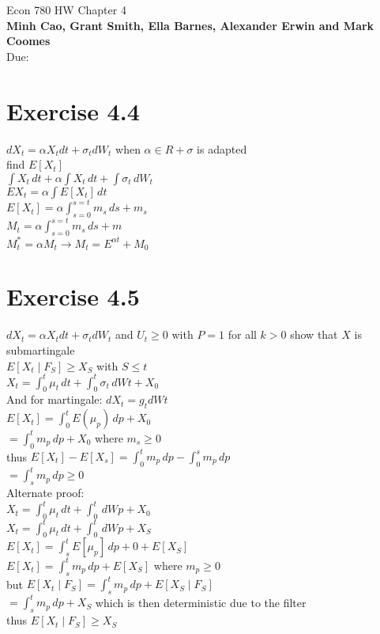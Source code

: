 \documentclass[12pt]{article}
\begin{document}
\begin{center}
{\Large Econ 780 \hspace{0.5cm} HW Chapter 4}\\
\textbf{Minh Cao, Grant Smith, Ella Barnes, Alexander Erwin and Mark Coomes}\\ %
Due:  %
\end{center}

\vspace{0.2 cm}

\section{Exercise 4.4}
$dX_t=\alpha X_tdt+\sigma_tdW_t$ when $\alpha\in R + \sigma$ is adapted\\
find $E[X_t]$\\
$\int X_t\,dt + \alpha\int X_t\,dt + \int \sigma_t\,dW_t$\\
$EX_t = \alpha\int E[X_t]\,dt$\\
$E[X_t] = \alpha\int_{s=0}^{s=t} m_s\,ds + m_s$\\
$M_t = \alpha\int_{s=0}^{s=t} m_s\,ds +m$\\
$M_t^* = \alpha M_t \rightarrow M_t = E^{\alpha t} + M_0$

\section{Exercise 4.5}
$dX_t=\alpha X_tdt+\sigma_tdW_t$ and $U_t\geq 0$ with $P=1$ for all $k>0$ show that $X$ is submartingale\\
$E[X_t\mid F_S] \geq X_S$ with $S\leq t$\\
$X_t = \int_{0}^{t} \mu_t\,dt + \int_{0}^{t} \sigma_t\,dWt + X_0$\\
And for martingale: $dX_t = g_tdWt$\\
$E[X_t] = \int_{0}^{t} E(\mu_p)\,dp + X_0$\\
$=\int_{0}^{t} m_p\,dp + X_0$ where $m_s\geq 0$\\
thus $E[X_t] - E[X_s] = \int_{0}^{t} m_p\,dp - \int_{0}^{s} m_p\,dp$\\
$=\int_{s}^{t} m_p\,dp \geq 0$\\

Alternate proof:\\
$X_t = \int_{0}^{t} \mu_t\,dt + \int_{0}^{t}\,dWp + X_0$\\
$X_t = \int_{0}^{t} \mu_t\,dt + \int_{0}^{t}\,dWp + X_S$\\
$E[X_t] = \int_{s}^{t} E[\mu_p]\,dp + 0 + E[X_S]$\\
$E[X_t] = \int_{s}^{t} m_p\,dp + E[X_S]$ where $m_p\geq0$\\
but $E[X_t\mid F_S] = \int_{s}^{t} m_p\,dp + E[X_S\mid F_S]$\\
$= \int_{s}^{t} m_p\,dp + X_S$ which is then deterministic due to the filter\\
thus $E[X_t\mid F_S] \geq X_S$
\end{document}

